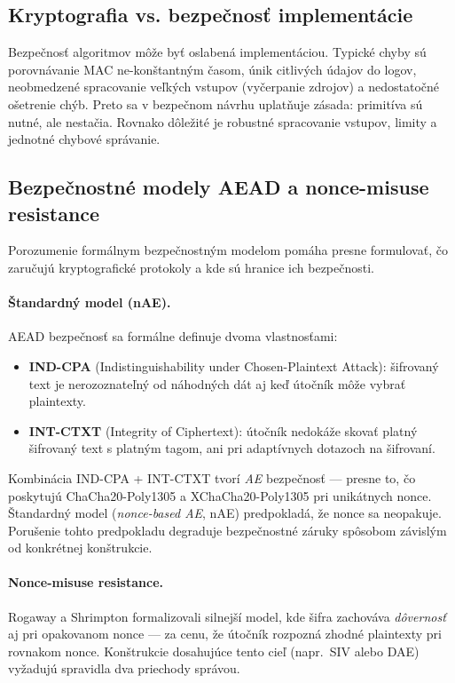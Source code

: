 \documentclass[journal,a4paper,onecolumn]{IEEEtran}
\begin{document}
\subsection{Kryptografia vs. bezpečnosť implementácie}

Bezpečnosť algoritmov môže byť oslabená implementáciou. Typické chyby sú porovnávanie MAC ne-konštantným časom, únik citlivých údajov do logov, neobmedzené spracovanie veľkých vstupov (vyčerpanie zdrojov) a nedostatočné ošetrenie chýb. Preto sa v bezpečnom návrhu uplatňuje zásada: primitíva sú nutné, ale nestačia. Rovnako dôležité je robustné spracovanie vstupov, limity a jednotné chybové správanie.

\subsection{Bezpečnostné modely AEAD a nonce-misuse resistance}

Porozumenie formálnym bezpečnostným modelom pomáha presne formulovať, čo zaručujú kryptografické protokoly a kde sú hranice ich bezpečnosti.

\paragraph{Štandardný model (nAE).}
AEAD bezpečnosť sa formálne definuje dvoma vlastnosťami\cite{RFC5116}:
\begin{itemize}[leftmargin=*,itemsep=2pt]
  \item \textbf{IND-CPA} (Indistinguishability under Chosen-Plaintext Attack): šifrovaný text je nerozoznateľný od náhodných dát aj keď útočník môže vybrať plaintexty.
  \item \textbf{INT-CTXT} (Integrity of Ciphertext): útočník nedokáže skovať platný šifrovaný text s platným tagom, ani pri adaptívnych dotazoch na šifrovaní.
\end{itemize}
Kombinácia IND-CPA + INT-CTXT tvorí \emph{AE} bezpečnosť --- presne to, čo poskytujú ChaCha20-Poly1305 a XChaCha20-Poly1305 pri unikátnych nonce\cite{RFC8439}. Štandardný model (\emph{nonce-based AE}, nAE) predpokladá, že nonce sa neopakuje. Porušenie tohto predpokladu degraduje bezpečnostné záruky spôsobom závislým od konkrétnej konštrukcie.

\paragraph{Nonce-misuse resistance.}
Rogaway a Shrimpton\cite{RogawayNonceMisuse2004} formalizovali silnejší model, kde šifra zachováva \emph{dôvernosť} aj pri opakovanom nonce --- za cenu, že útočník rozpozná zhodné plaintexty pri rovnakom nonce. Konštrukcie dosahujúce tento cieľ (napr.\ SIV alebo DAE)\cite{BellareNonceMisuse2006} vyžadujú spravidla dva priechody správou.
\end{document}
